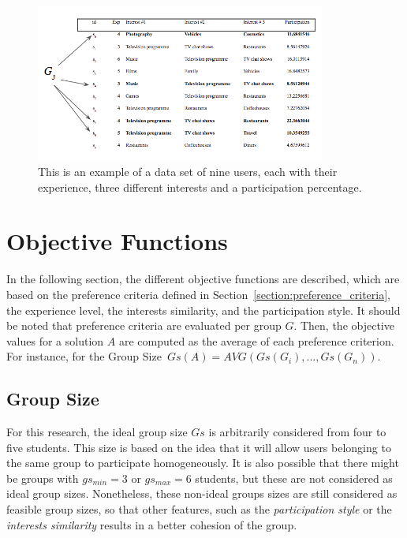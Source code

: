\begin{figure}[!htp]
    \includegraphics[width=0.85\textwidth]{images/dataset_eg.png}
    \caption{This is an example of a data set of nine users, each with their experience, three different interests and a participation percentage.}
    \label{fig:dataset_eg}
\end{figure}

\section{Objective Functions} 
\label{section:objective_functions}

In the following section, the different objective functions are described, which are based on the preference criteria defined in Section~\ref{section:preference_criteria}, the experience level, the interests similarity, and the participation style. It should be noted that preference criteria are evaluated per group $G$. Then, the objective values for a solution $A$ are computed as the average of each preference criterion. For instance, for the Group Size~$Gs(A) = AVG(Gs(G_i),...,Gs(G_n))$.\\

\subsection{Group Size}

For this research, the ideal group size $Gs$ is arbitrarily considered from four to five students. This size is based on the idea that it will allow users belonging to the same group to participate homogeneously. It is also possible that there might be groups with $gs_{min} = 3$ or $gs_{max} = 6$ students, but these are not considered as ideal group sizes. Nonetheless, these non-ideal groups sizes are still considered as feasible group sizes, so that other features, such as the \textit{participation style} or the \textit{interests similarity} results in a better cohesion of the group.\\


